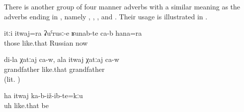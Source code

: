There is another group of four manner adverbs with a similar meaning as the adverbs ending in , namely , , , and  . Their usage is illustrated in .
%
\begin{exe}
	\ex	\label{ex:They are also like this, like Russians, even now}
	\gll	itːi	itwaj=ra	ʡuˁrusː-e	ʁunab-te	ca-b	hana=ra\\
		those	like.that	Russian	 		now\\
	\glt	{}

	\ex	\label{ex:(He) is my (real) grandfather. For you he is only an old man (lit. he is like a grandfather of yours)}
	\gll	di-la	χatːaj	ca-w,	ala	itwaj	χatːaj	ca-w\\
			grandfather			like.that	grandfather	\\
	\glt	{} (lit. )

	\ex	\label{ex:Uh, and so he did not marry}
	\gll	ha	itwaj	ka-b-iž-ib-te=kːu\\
		uh	like.that	be\\
	\glt	{}
\end{exe}

